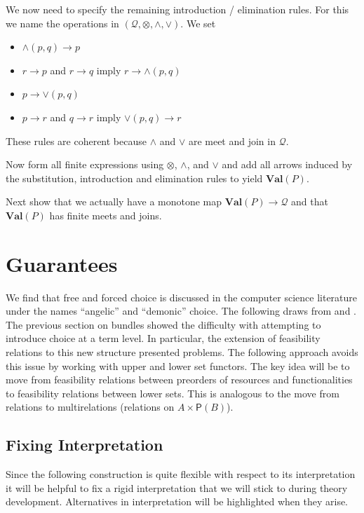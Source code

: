 \documentclass[12pt]{article}
\theoremstyle{definition}
\theoremstyle{plain}
\theoremstyle{plain}
\theoremstyle{plain}
\theoremstyle{plain}
\theoremstyle{remark}
\theoremstyle{remark}
\newcommand{\mc}[1]{\mathcal{#1}}
\begin{document}
We now need to specify the remaining introduction / elimination rules. For this we name the operations in $(\mc{Q},\otimes, \wedge, \vee)$. We set
\begin{itemize}
	\item $\wedge(p,q) \rightarrow  p$
	\item $r \rightarrow p$ and $r \rightarrow q$ imply $r \rightarrow \wedge(p,q)$
	\item $p \rightarrow \vee(p,q)$
	\item $p \rightarrow r$ and $q \rightarrow r$ imply $\vee(p,q) \rightarrow r$	
\end{itemize}

These rules are coherent because $\wedge$ and $\vee$ are meet and join in $\mc{Q}$.

Now form all finite expressions using $\otimes$, $\wedge$, and $\vee$ and add all arrows induced by the substitution, introduction and elimination rules to yield $\mathbf{Val}(P)$. 

Next show that we actually have a monotone map $\mathbf{Val}(P) \rightarrow \mc{Q}$ and that $\mathbf{Val}(P)$ has finite meets and joins. 

\newpage

\section{Guarantees}

We find that free and forced choice is discussed in the computer science literature under the names ``angelic'' and ``demonic'' choice. The following draws from \cite{Martin2007} and \cite{Morris2004}. \\

The previous section on bundles showed the difficulty with attempting to introduce choice at a term level. In particular, the extension of feasibility relations to this new structure presented problems. The following approach avoids this issue by working with upper and lower set functors. The key idea will be to move from feasibility relations between preorders of resources and functionalities to feasibility relations between lower sets. This is analogous to the move from relations to multirelations (relations on $A \times \mathsf{P}(B)$).

\subsection{Fixing Interpretation}
Since the following construction is quite flexible with respect to its interpretation it will be helpful to fix a rigid interpretation that we will stick to during theory development. Alternatives in interpretation will be highlighted when they arise.
\end{document}
